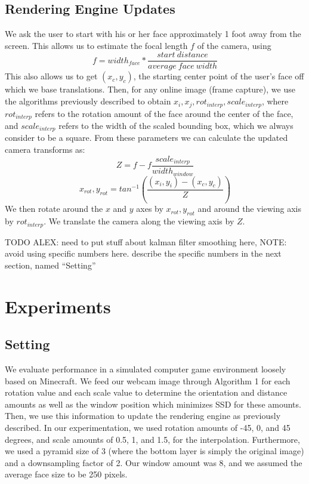 \documentclass[10pt,twocolumn,letterpaper]{article}
\begin{document}
\subsection*{Rendering Engine Updates}
We ask the user to start with his or her face approximately 1 foot away from the screen. This allows us to estimate the focal length $f$ of the camera, using
$$f = width_{face} * \frac{start\ distance}{average\ face\ width}$$
This also allows us to get $(x_c, y_c)$, the starting center point of the user's face off which we base translations.
Then, for any online image (frame capture), we use the algorithms previously described to obtain $x_i, x_j, rot_{interp}, scale_{interp}$, where $rot_{interp}$ refers to the rotation amount of the face around the center of the face, and $scale_{interp}$ refers to the width of the scaled bounding box, which we always consider to be a square. From these parameters we can calculate the updated camera transforms as:
$$Z = f - f \frac{scale_{interp}}{width_{window}}$$
$$x_{rot}, y_{rot} = tan^{-1}(\frac{(x_i,y_i)-(x_c,y_c)}{Z})$$
We then rotate around the $x$ and $y$ axes by $x_{rot}, y_{rot}$ and around the viewing axis by $rot_{interp}$. We translate the camera along the viewing axis by $Z$.

TODO ALEX: need to put stuff about kalman filter \cite{kalman} smoothing here,
NOTE: avoid using specific numbers here. describe the specific numbers in
the next section, named ``Setting''

\section{Experiments}

\subsection*{Setting}
We evaluate performance in a simulated computer game environment loosely based
on Minecraft. We feed our webcam image through Algorithm 1 for each rotation
value and each scale value to determine the orientation and distance amounts as well as
the window position which minimizes SSD for these amounts. Then, we use this
information to update the rendering engine as previously described. In our experimentation,
we used rotation amounts of -45, 0, and 45 degrees, and scale amounts of 0.5, 1, and 1.5,
for the interpolation. Furthermore, we used a pyramid size of 3 (where the bottom
layer is simply the original image) and a downsampling factor of 2. Our window amount
was 8, and we assumed the average face size to be 250 pixels.
\end{document}
